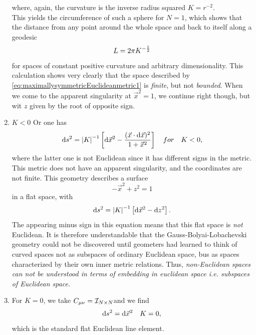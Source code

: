 \begin{enumerate}
\begin{equation}
\end{equation}
where, again, the curvature is the inverse radius squared $K = r^{-2}$.\\
This yields the circumference of such a sphere for $N=1$, which shows that the distance from any point around the whole space and back to itself along a geodesic
\begin{equation}
	L=2 \pi K^{-\frac{1}{2}}
\end{equation}
for spaces of constant positive curvature and arbitrary dimensionality. This calculation shows very clearly that the space described by \ref{eq:maximallysymmetricEuclideanmetric1} is \emph{finite}, but not \emph{bounded}. When we come to the apparent singularity at $\vec{x}^2=1$, we continue right though, but wit $z$ given by the root of opposite sign.

\item $K<0$
Or one has
\begin{equation}
\label{eq:maximallysymmetricnonEuclideanmetric2}
	\mathrm{d} s^2 = \abs{K}^{-1} \left[\mathrm{d} \vec{x}^2 - \frac{(\vec{x}\cdot \mathrm{d} \vec{x})^2}{1 +\vec{x}^2}\right] \quad for \quad K<0,
\end{equation}
where the latter one is not Euclidean since it has different signs in the metric. This metric does not have an apparent singularity, and the coordinates are not finite. This geometry describes a surface
\begin{equation}
	-\vec{x}^2 +z^2 =1
\end{equation}
in a flat space, with
\begin{equation}
	\mathrm{d} s^2 = \abs{K}^{-1} \left[\mathrm{d} \vec{x}^2 - \mathrm{d} z^2\right].
\end{equation}
The appearing minus sign in this equation means that this flat space is \emph{not} Euclidean. It is therefore understandable that the Gauss-Bolyai-Lobachevski geometry could not be discovered until geometers had learned to think of curved spaces not as subspaces of ordinary Euclidean space, bus as spaces characterized by their own inner metric relations. Thus, \emph{non-Euclidean spaces can not be understood in terms of embedding in euclidean space i.e. subspaces of Euclidean space.}
\item For $K=0$, we take $C_{\mu \nu}=\mathcal{I}_{N\times N}$and we find
\begin{equation}
	\mathrm{d} s^2 = \mathrm{d} \vec{x}^2 \quad K=0,
\end{equation}
which is the standard flat Euclidean line element.
\end{enumerate}
